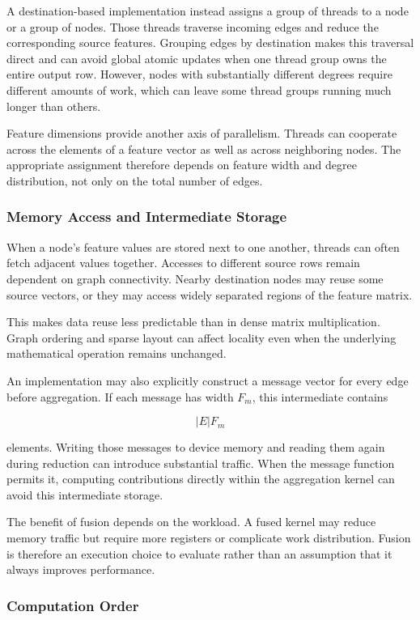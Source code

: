 A destination-based implementation instead assigns a group of threads to a node or a group of nodes. Those threads traverse incoming edges and reduce the corresponding source features. Grouping edges by destination makes this traversal direct and can avoid global atomic updates when one thread group owns the entire output row. However, nodes with substantially different degrees require different amounts of work, which can leave some thread groups running much longer than others.

Feature dimensions provide another axis of parallelism. Threads can cooperate across the elements of a feature vector as well as across neighboring nodes. The appropriate assignment therefore depends on feature width and degree distribution, not only on the total number of edges.

\subsubsection{Memory Access and Intermediate Storage}

When a node's feature values are stored next to one another, threads can often fetch adjacent values together. Accesses to different source rows remain dependent on graph connectivity. Nearby destination nodes may reuse some source vectors, or they may access widely separated regions of the feature matrix.

This makes data reuse less predictable than in dense matrix multiplication. Graph ordering and sparse layout can affect locality even when the underlying mathematical operation remains unchanged.

An implementation may also explicitly construct a message vector for every edge before aggregation. If each message has width $F_m$, this intermediate contains

\[
  |E|F_m
\]

elements. Writing those messages to device memory and reading them again during reduction can introduce substantial traffic. When the message function permits it, computing contributions directly within the aggregation kernel can avoid this intermediate storage.

The benefit of fusion depends on the workload. A fused kernel may reduce memory traffic but require more registers or complicate work distribution. Fusion is therefore an execution choice to evaluate rather than an assumption that it always improves performance.

\subsubsection{Computation Order}

